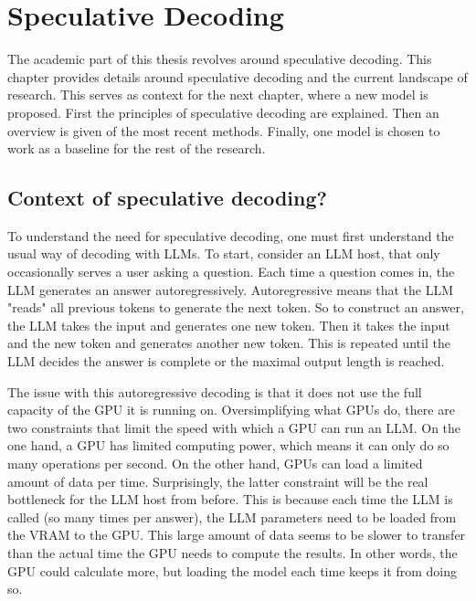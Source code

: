 
\chapter{Speculative Decoding}
\label{sec:speculative_decoding}

The academic part of this thesis revolves around speculative decoding. This chapter provides details around speculative decoding and the current landscape of research. This serves as context for the next chapter, where a new model is proposed. First the principles of speculative decoding are explained. Then an overview is given of the most recent methods. Finally, one model is chosen to work as a baseline for the rest of the research.

\section{Context of speculative decoding?}
To understand the need for speculative decoding, one must first understand the usual way of decoding with LLMs. To start, consider an LLM host, that only occasionally serves a user asking a question. Each time a question comes in, the LLM generates an answer autoregressively. Autoregressive means that the LLM "reads" all previous tokens to generate the next token. So to construct an answer, the LLM takes the input and generates one new token. Then it takes the input and the new token and generates another new token. This is repeated until the LLM decides the answer is complete or the maximal output length is reached.

The issue with this autoregressive decoding is that it does not use the full capacity of the GPU it is running on. Oversimplifying what GPUs do, there are two constraints that limit the speed with which a GPU can run an LLM. On the one hand, a GPU has limited computing power, which means it can only do so many operations per second. On the other hand, GPUs can load a limited amount of data per time. Surprisingly, the latter constraint will be the real bottleneck for the LLM host from before. This is because each time the LLM is called (so many times per answer), the LLM parameters need to be loaded from the VRAM to the GPU. This large amount of data seems to be slower to transfer than the actual time the GPU needs to compute the results. In other words, the GPU could calculate more, but loading the model each time keeps it from doing so.

